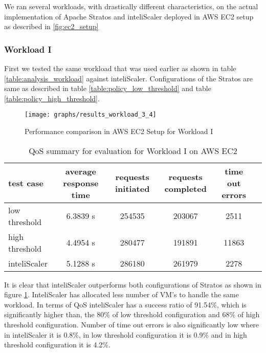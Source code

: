 We ran several workloads, with drastically different characteristics, on the actual implementation of Apache Stratos and inteliScaler deployed in AWS EC2 setup as described in \ref{fig:ec2_setup}
\subsubsection{Workload I}
First we tested the same workload that was used earlier as shown in table \ref{table:analysis_workload} against inteliScaler.  Configurations of the Stratos are same as described in table \ref{table:policy_low_threshold} and table \ref{table:policy_high_threshold}.
\begin{figure}[h!]
\centering
\captionsetup{justification=centering,margin=1cm}
\texttt{[image: graphs/results\_workload\_3\_4]}
\caption{Performance comparison in AWS EC2 Setup for Workload I}
\label{graph:workload_3}
\end{figure}


\begin{table}[h!]
\centering
\caption{QoS summary for evaluation for Workload I on AWS EC2}
\label{table:analysis_qos_workload_3}
\begin{tabular}{|l|c|c|c|c|c|}
\hline

test case & average  response time & requests initiated & requests completed  & time out errors \\ \hline

low threshold & 6.3839 s & 254535 & 203067 & 2511\\ \hline

high threshold & 4.4954 s & 280477 & 191891  & 11863\\ \hline

inteliScaler & 5.1288 s & 286180 & 261979  & 2278\\ \hline

\end{tabular}
\end{table}

It is clear that inteliScaler outperforms both configurations of Stratos as shown in figure \ref{graph:workload_3}. InteliScaler has allocated less number of VM's to handle the same workload. In terms of QoS inteliScaler has a success ratio of 91.54\%, which is significantly higher than, the 80\% of low threshold configuration and 68\% of high threshold configuration. Number of time out errors is also significantly low where in inteliScaler it is  0.8\%, in low threshold configuration it is 0.9\%  and in high threshold configuration it is  4.2\%. 

